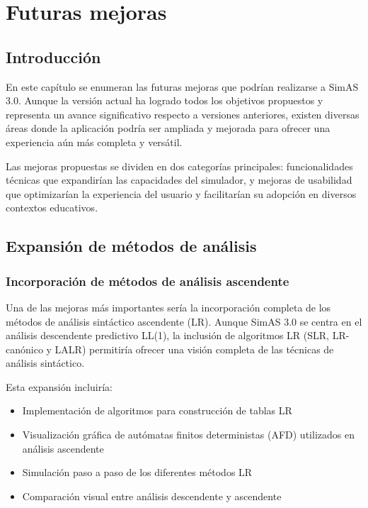 \chapter{Futuras mejoras} \label{cap: mejoras}

\section{Introducción}

En este capítulo se enumeran las futuras mejoras que podrían realizarse a SimAS 3.0. Aunque la versión actual ha logrado todos los objetivos propuestos y representa un avance significativo respecto a versiones anteriores, existen diversas áreas donde la aplicación podría ser ampliada y mejorada para ofrecer una experiencia aún más completa y versátil.

Las mejoras propuestas se dividen en dos categorías principales: funcionalidades técnicas que expandirían las capacidades del simulador, y mejoras de usabilidad que optimizarían la experiencia del usuario y facilitarían su adopción en diversos contextos educativos.

\section{Expansión de métodos de análisis}

\subsection{Incorporación de métodos de análisis ascendente}

Una de las mejoras más importantes sería la incorporación completa de los métodos de análisis sintáctico ascendente (LR). Aunque SimAS 3.0 se centra en el análisis descendente predictivo LL(1), la inclusión de algoritmos LR (SLR, LR-canónico y LALR) permitiría ofrecer una visión completa de las técnicas de análisis sintáctico.

Esta expansión incluiría:
\begin{itemize}
 \item Implementación de algoritmos para construcción de tablas LR
 \item Visualización gráfica de autómatas finitos deterministas (AFD) utilizados en análisis ascendente
 \item Simulación paso a paso de los diferentes métodos LR
 \item Comparación visual entre análisis descendente y ascendente
\end{itemize}


